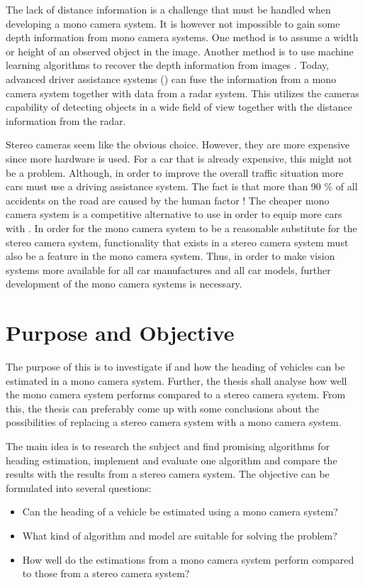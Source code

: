 The lack of distance information is a challenge that must be handled when developing a mono camera system.
It is however not impossible to gain some depth information from mono camera systems.
One method is to assume a width or height of an observed object in the image.
Another method is to use machine learning algorithms to recover the depth information from images \cite{Saxena:2008}.
Today, advanced driver assistance systems (\abbrADAS) can fuse the information from a mono camera system together with data from \eg a radar system.
This utilizes the cameras capability of detecting objects in a wide field of view together with the distance information from the radar.

Stereo cameras seem like the obvious choice.
However, they are more expensive since more hardware is used.
For a car that is already expensive, this might not be a problem.
Although, in order to improve the overall traffic situation more cars must use a driving assistance system.
The fact is that more than 90 \% of all accidents on the road are caused by the human factor \cite{EuroNCAP:2017}!
The cheaper mono camera system is a competitive alternative to use in order to equip more cars with \abbrADAS.
In order for the mono camera system to be a reasonable substitute for the stereo camera system, functionality that exists in a stereo camera system must also be a feature in the mono camera system.
Thus, in order to make vision systems more available for all car manufactures and all car models, further development of the mono camera systems is necessary.

\section{Purpose and Objective}
The purpose of this \ms is to investigate if and how the heading of vehicles can be estimated in a mono camera system.
Further, the thesis shall analyse how well the mono camera system performs compared to a stereo camera system.
From this, the thesis can preferably come up with some conclusions about the possibilities of replacing a stereo camera system with a mono camera system.

The main idea is to research the subject and find promising algorithms for heading estimation, implement and evaluate one algorithm and compare the results with the results from a stereo camera system.
The objective can be formulated into several questions:

\begin{itemize}
	\item Can the heading of a vehicle be estimated using a mono camera system?

	\item What kind of algorithm and model are suitable for solving the problem?

	\item How well do the estimations from a mono camera system perform compared to those from a stereo camera system?
\end{itemize}

